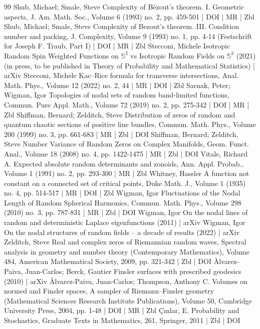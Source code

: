 \begin{thebibliography}{99}
Shub, Michael; Smale, Steve Complexity of Bézout’s theorem. I. Geometric aspects, J. Am. Math. Soc., Volume 6 (1993) no. 2, pp. 459-501 | DOI | MR | Zbl
Shub, Michael; Smale, Steve Complexity of Bezout’s theorem. III. Condition number and packing, J. Complexity, Volume 9 (1993) no. 1, pp. 4-14 (Festschrift for Joseph F. Traub, Part I) | DOI | MR | Zbl
Stecconi, Michele Isotropic Random Spin Weighted Functions on $\mathbb{S}^2$ vs Isotropic Random Fields on $\mathbb{S}^3$ (2021) (in press, to be published in Theory of Probability and Mathematical Statistics) | arXiv
Stecconi, Michele Kac–Rice formula for transverse intersections, Anal. Math. Phys., Volume 12 (2022) no. 2, 44 | MR | DOI | Zbl
Sarnak, Peter; Wigman, Igor Topologies of nodal sets of random band-limited functions, Commun. Pure Appl. Math., Volume 72 (2019) no. 2, pp. 275-342 | DOI | MR | Zbl
Shiffman, Bernard; Zelditch, Steve Distribution of zeros of random and quantum chaotic sections of positive line bundles, Commun. Math. Phys., Volume 200 (1999) no. 3, pp. 661-683 | MR | Zbl | DOI
Shiffman, Bernard; Zelditch, Steve Number Variance of Random Zeros on Complex Manifolds, Geom. Funct. Anal., Volume 18 (2008) no. 4, pp. 1422-1475 | MR | Zbl | DOI
Vitale, Richard A. Expected absolute random determinants and zonoids, Ann. Appl. Probab., Volume 1 (1991) no. 2, pp. 293-300 | MR | Zbl
Whitney, Hassler A function not constant on a connected set of critical points, Duke Math. J., Volume 1 (1935) no. 4, pp. 514-517 | MR | DOI | Zbl
Wigman, Igor Fluctuations of the Nodal Length of Random Spherical Harmonics, Commun. Math. Phys., Volume 298 (2010) no. 3, pp. 787-831 | MR | Zbl | DOI
Wigman, Igor On the nodal lines of random and deterministic Laplace eigenfunctions (2011) | arXiv
Wigman, Igor On the nodal structures of random fields – a decade of results (2022) | arXiv
Zelditch, Steve Real and complex zeros of Riemannian random waves, Spectral analysis in geometry and number theory (Contemporary Mathematics), Volume 484, American Mathematical Society, 2009, pp. 321-342 | Zbl | DOI
Àlvarez-Paiva, Juan-Carlos; Berck, Gautier Finsler surfaces with prescribed geodesics (2010) | arXiv
Àlvarez-Paiva, Juan-Carlos; Thompson, Anthony C. Volumes on normed and Finsler spaces, A sampler of Riemann–Finsler geometry (Mathematical Sciences Research Institute Publications), Volume 50, Cambridge University Press, 2004, pp. 1-48 | DOI | MR | Zbl
Çınlar, E. Probability and Stochastics, Graduate Texts in Mathematics, 261, Springer, 2011 | Zbl | DOI
\end{thebibliography}
